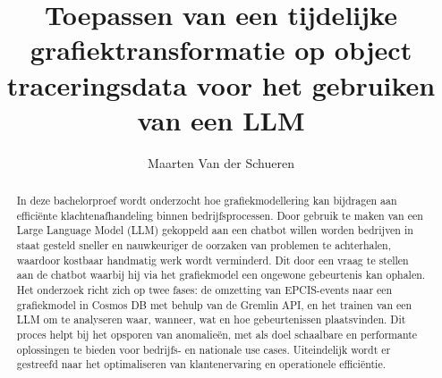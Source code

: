 \documentclass[a0,portrait]{hogent-poster}
\title{Toepassen van een tijdelijke \newline grafiektransformatie op object traceringsdata voor het gebruiken van een LLM}
\author{Maarten Van der Schueren}
\begin{document}
\maketitle

\begin{abstract}
  In deze bachelorproef wordt onderzocht hoe grafiekmodellering kan bijdragen aan efficiënte klachtenafhandeling binnen bedrijfsprocessen. 
  Door gebruik te maken van een Large Language Model (LLM) gekoppeld aan een chatbot willen worden bedrijven in staat gesteld sneller en nauwkeuriger de oorzaken van problemen te achterhalen, waardoor kostbaar handmatig werk wordt verminderd. 
  Dit door een vraag te stellen aan de chatbot waarbij hij via het grafiekmodel een ongewone gebeurtenis kan ophalen. Het onderzoek richt zich op twee fases: de omzetting van EPCIS-events naar een grafiekmodel in Cosmos DB met behulp van de Gremlin API, en het trainen van een LLM om te analyseren waar, wanneer, wat en hoe gebeurtenissen plaatsvinden. 
  Dit proces helpt bij het opsporen van anomalieën, met als doel schaalbare en performante oplossingen te bieden voor bedrijfs- en nationale use cases. 
  Uiteindelijk wordt er gestreefd naar het optimaliseren van klantenervaring en operationele efficiëntie.
\end{abstract}
\end{document}
